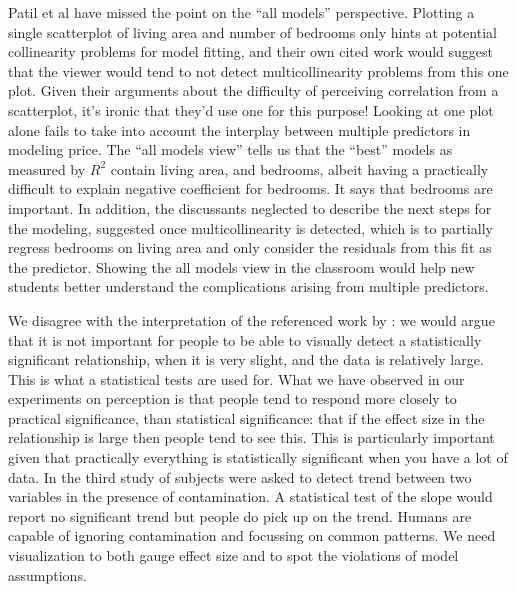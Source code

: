 \documentclass[preprint]{imsart}
\begin{document}
Patil et al have missed the point on the ``all models'' perspective. Plotting a single scatterplot of living area and number of bedrooms only hints at potential collinearity problems for model fitting, and their own cited work would suggest that the viewer would tend to not detect multicollinearity problems from this one plot. Given their arguments about the difficulty of perceiving correlation from a scatterplot, it's ironic that they'd use one for this purpose!  Looking at one plot alone fails to take into account the interplay between multiple predictors in modeling price. The ``all models view'' tells us that the ``best'' models as measured by $R^2$ contain living area, and bedrooms, albeit having a practically difficult to explain negative coefficient for bedrooms. It says that bedrooms are important. In addition, the discussants neglected to describe the next steps for the modeling, suggested once multicollinearity is detected, which is to partially regress bedrooms on living area and only consider the residuals from this fit as the predictor. Showing the all models view in the classroom would help new students better understand the complications arising from multiple predictors.

We disagree with the interpretation of the referenced work by \cite{Fisher}: we would argue that it is not important for people to be able to visually detect a statistically significant relationship, when it is very slight, and the data is relatively large. This is what a statistical tests are used for. What we have observed in our experiments on perception is that people tend to respond more closely to practical significance, than statistical significance: that if the effect size in the relationship is large then people tend to see this. This is particularly important given that practically everything is statistically significant when you have a lot of data. In the third study of \cite{majumder:2013} subjects were asked to detect trend between two variables in the presence of contamination. A statistical test of the slope would report no significant trend but people do pick up on the trend. Humans are capable of ignoring contamination and focussing on common patterns. We need visualization to both gauge effect size and to spot the violations of model assumptions. 
\end{document}
